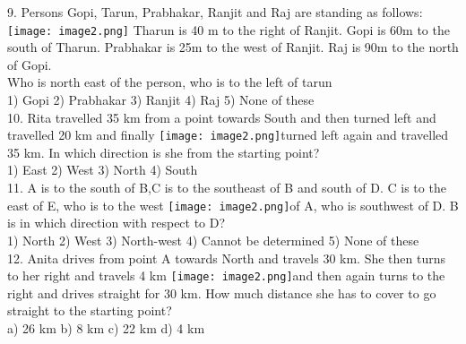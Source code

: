 \documentclass[
]{article}
\begin{document}
9. Persons Gopi, Tarun, Prabhakar, Ranjit and Raj are standing as follows:\\
\texttt{[image: image2.png]}
Tharun is 40 m to the right of Ranjit. Gopi is 60m to the south of Tharun. Prabhakar is 25m
to the west of Ranjit. Raj is 90m to the north of Gopi.\\
Who is north east of the person, who is to the left of tarun\\
1) Gopi \hspace{2mm}2) Prabhakar \hspace{2mm}3) Ranjit \hspace{2mm}4) Raj \hspace{2mm}5) None of these\\

10. Rita travelled 35 km from a point towards South and then turned left and travelled 20 km
and finally \texttt{[image: image2.png]}turned left again and travelled 35 km. In which direction is she from the starting
point?\\
1) East \hspace{2mm}2) West \hspace{2mm}3) North \hspace{2mm}4) South\\

11. A is to the south of B,C is to the southeast of B and south of D. C is to the east of E, who is to
the west \texttt{[image: image2.png]}of A, who is southwest of D. B is in which direction with respect to D?\\
1) North \hspace{2mm}2) West \hspace{2mm}3) North-west \hspace{2mm}4) Cannot be determined \hspace{2mm}5) None of these\\

12. Anita drives from point A towards North and travels 30 km. She then turns to her right and
travels 4 km \texttt{[image: image2.png]}and then again turns to the right and drives straight for 30 km. How much
distance she has to cover to go straight to the starting point?\\
a) 26 km \hspace{2mm}b) 8 km \hspace{2mm}c) 22 km \hspace{2mm}d) 4 km\\
\end{document}
